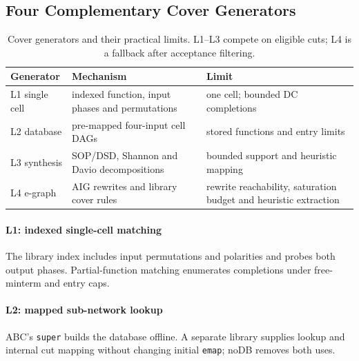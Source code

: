 \subsection{Four Complementary Cover Generators}
\begin{table}[t]
  \centering\footnotesize
  \caption{Cover generators and their practical limits. L1--L3 compete on eligible cuts; L4 is a fallback after acceptance filtering.}\label{tab:layers}
  \tabcolsep=3pt
  \begin{tabular}{@{}l >{\raggedright\arraybackslash}p{3.05cm} >{\raggedright\arraybackslash}p{3.05cm}@{}}
    \toprule
    Generator & Mechanism & Limit \\
    \midrule
    L1 single cell & indexed function, input phases and permutations & one cell; bounded DC completions \\
    L2 database & pre-mapped four-input cell DAGs & stored functions and entry limits \\
    L3 synthesis & SOP/DSD, Shannon and Davio decompositions & bounded support and heuristic mapping \\
    L4 e-graph & AIG rewrites and library cover rules & rewrite reachability, saturation budget and heuristic extraction \\
    \bottomrule
  \end{tabular}
\end{table}

\paragraph{L1: indexed single-cell matching}
The library index includes input permutations and polarities and probes both output phases. Partial-function matching enumerates completions under free-minterm and entry caps.

\paragraph{L2: mapped sub-network lookup}
ABC's \texttt{super} builds the database offline. A separate library supplies lookup and internal cut mapping without changing initial \texttt{emap}; noDB removes both uses.


